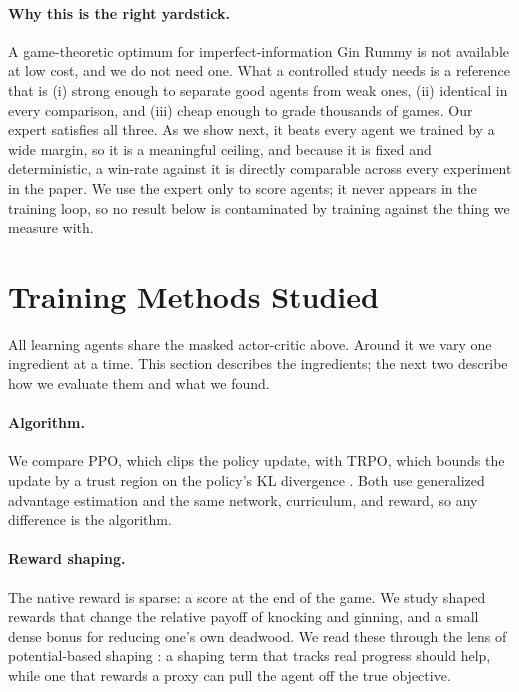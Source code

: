 \documentclass[letterpaper]{article} %
\begin{document}
\paragraph{Why this is the right yardstick.}
A game-theoretic optimum for imperfect-information Gin Rummy is not available at
low cost, and we do not need one. What a controlled study needs is a reference that
is (i) strong enough to separate good agents from weak ones, (ii) identical in
every comparison, and (iii) cheap enough to grade thousands of games. Our expert
satisfies all three. As we show next, it beats every agent we trained by a wide
margin, so it is a meaningful ceiling, and because it is fixed and
deterministic, a win-rate against it is directly comparable across every
experiment in the paper. We use the expert only to score agents; it never
appears in the training loop, so no result below is contaminated by training
against the thing we measure with.

\section{Training Methods Studied}
All learning agents share the masked actor-critic above. Around it we vary one
ingredient at a time. This section describes the ingredients; the next two
describe how we evaluate them and what we found.

\paragraph{Algorithm.}
We compare PPO, which clips the policy update, with TRPO, which bounds the
update by a trust region on the policy's KL divergence \citep{ppo,trpo}. Both use
generalized advantage estimation \citep{gae} and the same network, curriculum,
and reward, so any difference is the algorithm.

\paragraph{Reward shaping.}
The native reward is sparse: a score at the end of the game. We study shaped
rewards that change the relative payoff of knocking and ginning, and a small
dense bonus for reducing one's own deadwood. We read these through the lens of
potential-based shaping \citep{shaping}: a shaping term that tracks real progress
should help, while one that rewards a proxy can pull the agent off the true
objective.
\end{document}
